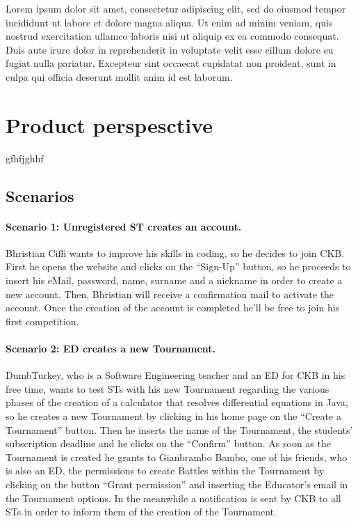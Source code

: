 Lorem ipsum dolor sit amet, consectetur adipiscing elit, sed do eiusmod tempor incididunt ut labore et dolore magna aliqua. Ut enim ad minim veniam, quis nostrud exercitation ullamco laboris nisi ut aliquip ex ea commodo consequat. Duis aute irure dolor in reprehenderit in voluptate velit esse cillum dolore eu fugiat nulla pariatur. Excepteur sint occaecat cupidatat non proident, sunt in culpa qui officia deserunt mollit anim id est laborum.

\newpage

\section{Product perspesctive}
\label{sec:product_perspesctive}%
gfhfjghhf

\subsection{Scenarios}
\label{subsec:scenarios}%
\paragraph{Scenario 1: Unregistered ST creates an account.}
Bhristian Ciffi wants to improve his skills in coding, so he decides to join CKB. First he opens the website and clicks on the “Sign-Up” button, so he proceeds to insert his eMail, password, name, surname and a nickname in order to create a new account. Then, Bhristian will receive a confirmation mail to activate the account. Once the creation of the account is completed he’ll be free to join his first competition.

\paragraph{Scenario 2: ED creates a new Tournament.}
DumbTurkey, who is a Software Engineering teacher and an ED for CKB in his free time, wants to test STs with his new Tournament regarding the various phases of the creation of a calculator that resolves differential equations in Java, so he creates a new Tournament by clicking in his home page on the “Create a Tournament” button. Then he inserts the name of the Tournament, the students’ subscription deadline and he clicks on the “Confirm” button. As soon as the Tournament is created he grants to Gianbrambo Bambo, one of his friends, who is also an ED, the permissions to create Battles within the Tournament by clicking on the button “Grant permission” and inserting the Educator’s email in the Tournament options. In the meanwhile a notification is sent by CKB to all STs in order to inform them of the creation of the Tournament.

